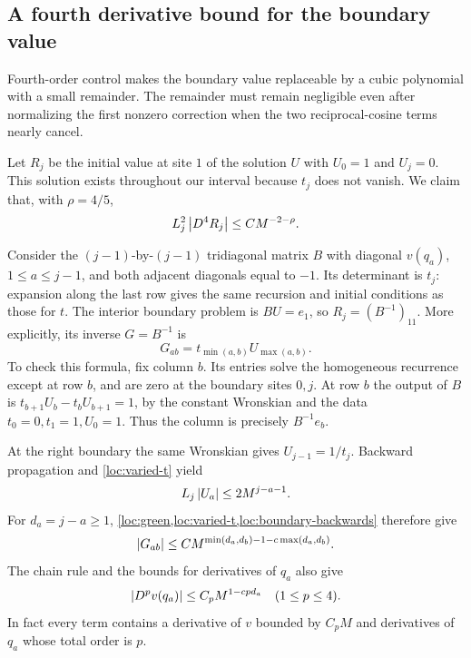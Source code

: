 \subsection{A fourth derivative bound for the boundary value}

Fourth-order control makes the boundary value replaceable by a cubic
polynomial with a small remainder. The remainder must remain negligible
even after normalizing the first nonzero correction when the two
reciprocal-cosine terms nearly cancel.

Let $R_j$ be the initial value at site $1$ of the solution $U$ with
$U_0=1$ and $U_j=0$. This solution exists throughout our interval
because $t_j$ does not vanish. We claim that, with $\rho=4/5$,
\begin{equation}
 L_j^2\left\lvert D^4R_j\right\rvert\le C M^{-2-\rho}.
 \label{loc:boundary-fourth}
\end{equation}

Consider the $(j-1)$-by-$(j-1)$ tridiagonal matrix $B$ with diagonal
$v(q_a)$, $1\le a\le j-1$, and both adjacent diagonals equal to
$-1$. Its determinant is $t_j$: expansion along the last row gives
the same recursion and initial conditions as those for $t$.
The interior boundary problem is $BU=e_1$, so $R_j=(B^{-1})_{11}$.
More explicitly, its inverse $G=B^{-1}$ is
\begin{equation}
 G_{ab}=t_{\min(a,b)}U_{\max(a,b)}.
 \label{loc:green}
\end{equation}
To check this formula, fix column $b$. Its entries solve the homogeneous
recurrence except at row $b$, and are zero at the boundary sites $0,j$.
At row $b$ the output of $B$ is
$t_{b+1}U_b-t_bU_{b+1}=1$, by the constant Wronskian and the data
$t_0=0,t_1=1,U_0=1$. Thus the column is precisely $B^{-1}e_b$.

At the right boundary the same Wronskian gives
$U_{j-1}=1/t_j$. Backward propagation and
\cref{loc:varied-t} yield
\begin{equation}
 L_j\left\lvert U_a\right\rvert\le2M^{j-a-1}.
 \label{loc:boundary-backwards}
\end{equation}
For $d_a=j-a\ge1$, \cref{loc:green,loc:varied-t,loc:boundary-backwards}
therefore give
\begin{equation}
 \left\lvert G_{ab}\right\rvert\le C
 M^{\min(d_a,d_b)-1-c\max(d_a,d_b)}.
 \label{loc:green-size}
\end{equation}
The chain rule and the bounds for derivatives of $q_a$ also give
\begin{equation}
 \left\lvert D^p v(q_a)\right\rvert\le C_p M^{1-cp d_a}
 \quad(1\le p\le4).
 \label{loc:potential-derivatives}
\end{equation}
In fact every term contains a derivative of $v$ bounded by $C_pM$
and derivatives of $q_a$ whose total order is $p$.

